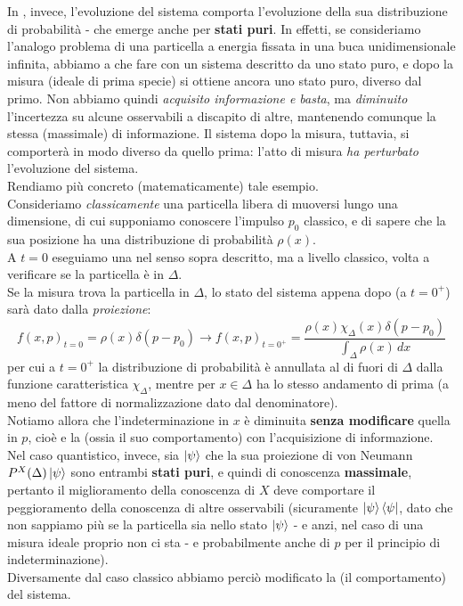 \documentclass[../../FisicaTeorica.tex]{subfiles}
\begin{document}
In \MQ, invece, l'evoluzione del sistema comporta l'evoluzione della sua distribuzione di probabilità - che emerge anche per \textbf{stati puri}. In effetti, se consideriamo l'analogo problema di una particella a energia fissata in una buca unidimensionale infinita, abbiamo a che fare con un sistema descritto da uno stato puro, e dopo la misura (ideale di prima specie) si ottiene ancora uno stato puro, diverso dal primo. Non abbiamo quindi \textit{acquisito informazione e basta}, ma \textit{diminuito} l'incertezza su alcune osservabili a discapito di altre, mantenendo comunque la stessa  (massimale) di informazione. Il sistema dopo la misura, tuttavia, si comporterà in modo diverso da quello prima: l'atto di misura \textit{ha perturbato} l'evoluzione del sistema.\\

Rendiamo più concreto (matematicamente) tale esempio.\\
Consideriamo \textit{classicamente} una particella libera di muoversi lungo una dimensione, di cui supponiamo conoscere l'impulso $p_0$ classico, e di sapere che la sua posizione ha una distribuzione di probabilità $\rho(x)$.\\
A $t=0$ eseguiamo una  nel senso sopra descritto, ma a livello classico, volta a verificare se la particella è in $\Delta$.\\
Se la misura trova la particella in $\Delta$, lo stato del sistema appena dopo (a $t=0^+$) sarà dato dalla \textit{proiezione}:
\[
f(x,p)_{t=0} = \rho(x)\delta(p-p_0)\to 
f(x,p)_{t=0^+} =
\frac{\rho(x)\chi_\Delta(x)\delta(p-p_0)}{\displaystyle \int_\Delta \rho(x)\,dx}
\]
per cui a $t=0^+$ la distribuzione di probabilità è annullata al di fuori di $\Delta$ dalla funzione caratteristica $\chi_\Delta$, mentre per $x\in \Delta$ ha lo stesso andamento di prima (a meno del fattore di normalizzazione dato dal denominatore).\\
Notiamo allora che l'indeterminazione in $x$ è diminuita \textbf{senza modificare} quella in $p$, cioè e la  (ossia il suo comportamento) con l'acquisizione di informazione.\\

Nel caso quantistico, invece, sia $\Ket{\psi}$ che la sua proiezione di von Neumann $P^X(\Delta)\Ket{\psi}$ sono entrambi \textbf{stati puri}, e quindi di conoscenza \textbf{massimale}, pertanto il miglioramento della conoscenza di $X$ deve comportare il peggioramento della conoscenza di altre osservabili (sicuramente $\Ket{\psi}\Bra{\psi}$, dato che non sappiamo più se la particella sia nello stato $\Ket{\psi}$ - e anzi, nel caso di una misura ideale proprio non ci sta - e probabilmente anche di $p$ per il principio di indeterminazione).\\
Diversamente dal caso classico abbiamo perciò modificato la  (il comportamento) del sistema.\\
\end{document}
